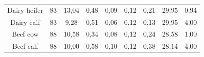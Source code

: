 \begin{refsection}[referencesCh4]
\begin{table}[h]
{\begin{tabular}{@{}ccccccccc@{}}
			Dairy heifer                                             & 83                                                     & 13,04                                                           & 0,48                                                     & 0,09                                                     & 0,12                                                      & 0,21                                                     & 29,95                                                              & 0,94                                                              \\
			Dairy calf                                               & 83                                                     & 9,28                                                            & 0,51                                                     & 0,06                                                     & 0,12                                                      & 0,13                                                     & 29,95                                                              & 4,00                                                              \\
			Beef cow                                                 & 88                                                     & 10,58                                                           & 0,34                                                     & 0,08                                                     & 0,12                                                      & 0,24                                                     & 28,58                                                              & 1,00                                                              \\
			Beef calf                                                & 88                                                     & 10,00                                                           & 0,58                                                     & 0,10                                                     & 0,12                                                      & 0,38                                                     & 28,14                                                              & 4,00                                                              \\ \bottomrule
	\end{tabular}}
\end{table}


\end{refsection}

